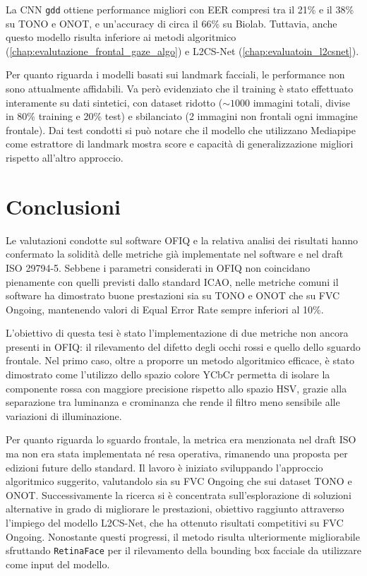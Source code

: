 \documentclass[12pt,a4paper,openright,twoside]{book}
\begin{document}
La CNN \texttt{gdd} ottiene performance migliori con EER compresi tra il 21\% e il 38\% su TONO e ONOT, e un'accuracy di circa il 66\% su Biolab. Tuttavia, anche questo modello risulta inferiore ai metodi algoritmico (\ref{chap:evalutazione_frontal_gaze_algo}) e L2CS-Net (\ref{chap:evaluatoin_l2csnet}).  

Per quanto riguarda i modelli basati sui landmark facciali, le performance non sono attualmente affidabili. Va però evidenziato che il training è stato effettuato interamente su dati sintetici, con dataset ridotto (\(\sim1000\) immagini totali, divise in 80\% training e 20\% test) e sbilanciato (2 immagini non frontali ogni immagine frontale).
Dai test condotti si può notare che il modello che utilizzano Mediapipe come estrattore di landmark mostra score e capacità di generalizzazione migliori rispetto all'altro approccio.

\chapter{Conclusioni}
Le valutazioni condotte sul software OFIQ e la relativa analisi dei risultati hanno confermato la solidità delle metriche già implementate nel software e nel draft ISO 29794-5. Sebbene i parametri considerati in OFIQ non coincidano pienamente con quelli previsti dallo standard ICAO, nelle metriche comuni il software ha dimostrato buone prestazioni sia su TONO e ONOT che su FVC Ongoing, mantenendo valori di Equal Error Rate sempre inferiori al 10\%.  

L'obiettivo di questa tesi è stato l'implementazione di due metriche non ancora presenti in OFIQ: il rilevamento del difetto degli occhi rossi e quello dello sguardo frontale. Nel primo caso, oltre a proporre un metodo algoritmico efficace, è stato dimostrato come l'utilizzo dello spazio colore YCbCr permetta di isolare la componente rossa con maggiore precisione rispetto allo spazio HSV, grazie alla separazione tra luminanza e crominanza che rende il filtro meno sensibile alle variazioni di illuminazione.  

Per quanto riguarda lo sguardo frontale, la metrica era menzionata nel draft ISO ma non era stata implementata né resa operativa, rimanendo una proposta per edizioni future dello standard. Il lavoro è iniziato sviluppando l'approccio algoritmico suggerito, valutandolo sia su FVC Ongoing che sui dataset TONO e ONOT. Successivamente la ricerca si è concentrata sull'esplorazione di soluzioni alternative in grado di migliorare le prestazioni, obiettivo raggiunto attraverso l'impiego del modello L2CS-Net, che ha ottenuto risultati competitivi su FVC Ongoing. Nonostante questi progressi, il metodo risulta ulteriormente migliorabile sfruttando \texttt{RetinaFace} per il rilevamento della bounding box facciale da utilizzare come input del modello.  
\end{document}
